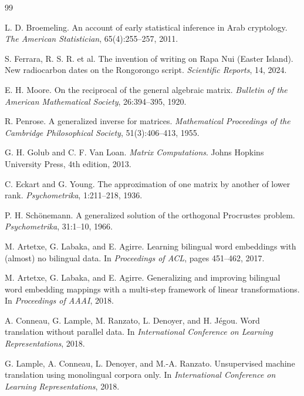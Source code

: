 \documentclass[11pt,a4paper]{article}
\newcommand{\1}{\mathbf{1}}
\numberwithin{equation}{section}
\begin{document}
\begin{thebibliography}{99}

L. D. Broemeling.
\newblock An account of early statistical inference in Arab cryptology.
\newblock \emph{The American Statistician}, 65(4):255--257, 2011.

S. Ferrara, R. S. R. et al.
\newblock The invention of writing on Rapa Nui (Easter Island). New radiocarbon dates on the Rongorongo script.
\newblock \emph{Scientific Reports}, 14, 2024.

E. H. Moore.
\newblock On the reciprocal of the general algebraic matrix.
\newblock \emph{Bulletin of the American Mathematical Society}, 26:394--395, 1920.

R. Penrose.
\newblock A generalized inverse for matrices.
\newblock \emph{Mathematical Proceedings of the Cambridge Philosophical Society}, 51(3):406--413, 1955.

G. H. Golub and C. F. Van Loan.
\newblock \emph{Matrix Computations}.
\newblock Johns Hopkins University Press, 4th edition, 2013.

C. Eckart and G. Young.
\newblock The approximation of one matrix by another of lower rank.
\newblock \emph{Psychometrika}, 1:211--218, 1936.

P. H. Sch{\"o}nemann.
\newblock A generalized solution of the orthogonal Procrustes problem.
\newblock \emph{Psychometrika}, 31:1--10, 1966.

M. Artetxe, G. Labaka, and E. Agirre.
\newblock Learning bilingual word embeddings with (almost) no bilingual data.
\newblock In \emph{Proceedings of ACL}, pages 451--462, 2017.

M. Artetxe, G. Labaka, and E. Agirre.
\newblock Generalizing and improving bilingual word embedding mappings with a multi-step framework of linear transformations.
\newblock In \emph{Proceedings of AAAI}, 2018.

A. Conneau, G. Lample, M. Ranzato, L. Denoyer, and H. J{\'e}gou.
\newblock Word translation without parallel data.
\newblock In \emph{International Conference on Learning Representations}, 2018.

G. Lample, A. Conneau, L. Denoyer, and M.-A. Ranzato.
\newblock Unsupervised machine translation using monolingual corpora only.
\newblock In \emph{International Conference on Learning Representations}, 2018.


\end{thebibliography}
\end{document}
